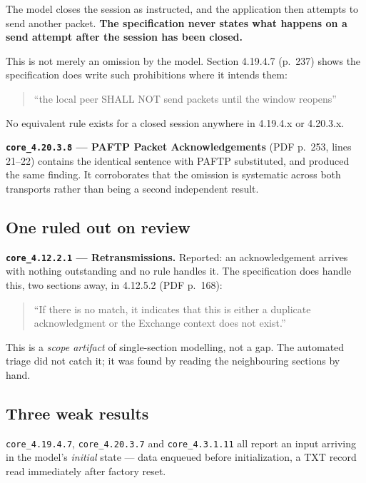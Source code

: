 \documentclass[11pt,a4paper]{article}
\begin{document}
The model closes the session as instructed, and the application then attempts to send
another packet. \textbf{The specification never states what happens on a send attempt
after the session has been closed.}

This is not merely an omission by the model. Section 4.19.4.7 (p.~237) shows the
specification does write such prohibitions where it intends them:

\begin{quote}
``the local peer SHALL NOT send packets until the window reopens''
\end{quote}

No equivalent rule exists for a closed session anywhere in 4.19.4.x or 4.20.3.x.

\textbf{\texttt{core\_4.20.3.8} --- PAFTP Packet Acknowledgements} (PDF p.~253,
lines 21--22) contains the identical sentence with PAFTP substituted, and produced
the same finding. It corroborates that the omission is systematic across both
transports rather than being a second independent result.

\subsection{One ruled out on review}

\textbf{\texttt{core\_4.12.2.1} --- Retransmissions.} Reported: an acknowledgement
arrives with nothing outstanding and no rule handles it. The specification does
handle this, two sections away, in 4.12.5.2 (PDF p.~168):

\begin{quote}
``If there is no match, it indicates that this is either a duplicate acknowledgment or
the Exchange context does not exist.''
\end{quote}

This is a \emph{scope artifact} of single-section modelling, not a gap. The automated
triage did not catch it; it was found by reading the neighbouring sections by hand.

\subsection{Three weak results}

\texttt{core\_4.19.4.7}, \texttt{core\_4.20.3.7} and \texttt{core\_4.3.1.11} all
report an input arriving in the model's \emph{initial} state --- data enqueued before
initialization, a TXT record read immediately after factory reset.
\end{document}
